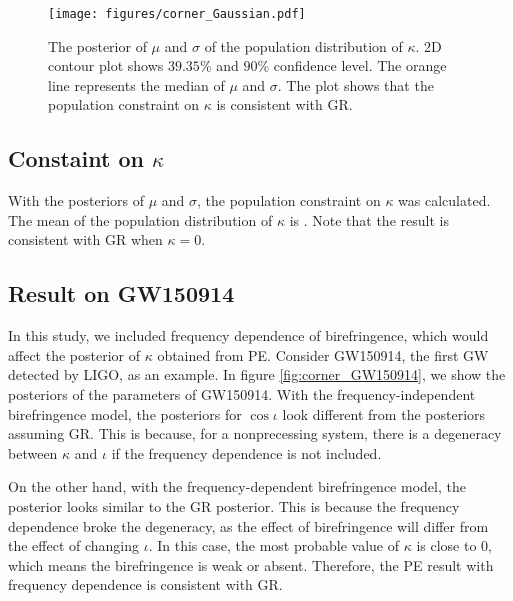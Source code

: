 \documentclass[aps,prd,twocolumn,superscriptaddress,preprintnumbers,floatfix,nofootinbib]{revtex4-2}
\begin{document}
\begin{figure}[h]
    \texttt{[image: figures/corner\_Gaussian.pdf]}
    \caption{
        The posterior of $\mu$ and $\sigma$ of the population distribution of $\kappa$.
        2D contour plot shows $39.35\%$ and $90\%$ confidence level.
        The orange line represents the median of $\mu$ and $\sigma$.
        The plot shows that the population constraint on $\kappa$ is consistent with GR.
    }
    \label{fig:corner_Gaussian}
\end{figure}

\subsection{Constaint on $\kappa$}
With the posteriors of $\mu$ and $\sigma$, the population constraint on $\kappa$ was calculated.
The mean of the population distribution of $\kappa$ is .
Note that the result is consistent with GR when $\kappa=0$.


\subsection{Result on GW150914}
In this study, we included frequency dependence of birefringence, which would affect the posterior of $\kappa$ obtained from PE.
Consider GW150914, the first GW detected by LIGO, as an example.
In figure \ref{fig:corner_GW150914}, we show the posteriors of the parameters of GW150914.
With the frequency-independent birefringence model, the posteriors for $\cos\iota$ look different from the posteriors assuming GR.
This is because, for a nonprecessing system, there is a degeneracy between $\kappa$ and $\iota$ if the frequency dependence is not included.

On the other hand, with the frequency-dependent birefringence model, the posterior looks similar to the GR posterior.
This is because the frequency dependence broke the degeneracy, as the effect of birefringence will differ from the effect of changing $\iota$.
In this case, the most probable value of $\kappa$ is close to $0$, which means the birefringence is weak or absent.
Therefore, the PE result with frequency dependence is consistent with GR.
\end{document}
